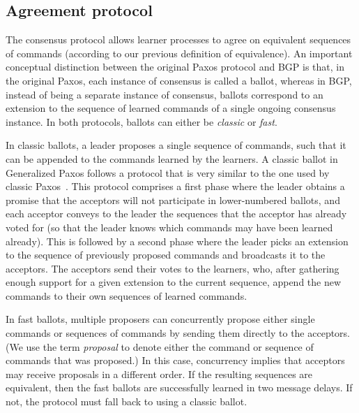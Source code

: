 \subsection{Agreement protocol} 

The consensus protocol allows learner processes to agree on equivalent sequences of commands (according to our previous definition of equivalence).
An important conceptual distinction between the original Paxos protocol and BGP is that, in the original Paxos, each instance of consensus is called a ballot, whereas in BGP, instead of being a separate instance of consensus, 
ballots correspond to an extension to the sequence of learned commands of a single ongoing consensus instance.
In both protocols, ballots can either be \textit{classic} or \textit{fast}. 


In classic ballots, a leader proposes a single sequence of commands, such that it can be appended to the commands learned by the learners. 
A classic ballot in Generalized Paxos follows a protocol that is very similar to the one used by classic Paxos~\cite{Lam98}. This protocol comprises a first phase where the leader obtains a promise  that the acceptors will not participate in lower-numbered ballots, and each acceptor conveys to the leader the sequences that the acceptor has already voted for (so that the leader knows which commands may have been learned already). This is followed by a second phase where the leader picks an extension to the sequence of previously proposed commands and broadcasts it to the acceptors. The acceptors send their votes to the learners, who, after gathering enough support for a given extension to the current sequence, append the new commands to their own sequences of learned commands.

In fast ballots, multiple proposers can concurrently propose either single commands or sequences of commands by sending them directly to the acceptors. (We use the term \textit{proposal} to denote either the command or sequence of commands that was proposed.)
In this case, concurrency implies that acceptors may receive proposals in a different order. If the resulting sequences are equivalent, then the fast ballots are successfully learned in two message delays. If not, the protocol must fall back to using a classic ballot.

